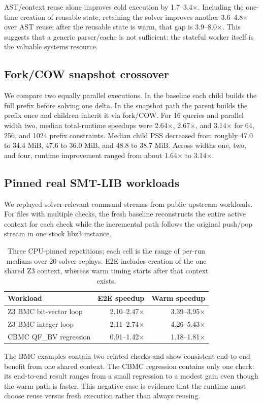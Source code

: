 \documentclass[10pt,twocolumn]{article}
\begin{document}
AST/context reuse alone improves cold execution by 1.7--3.4$\times$.
Including the one-time creation of reusable state, retaining the solver
improves another 3.6--4.8$\times$ over AST reuse; after the reusable state is
warm, that gap is 3.9--8.0$\times$. This suggests that a generic parser/cache
is not sufficient: the stateful worker itself is the valuable systems resource.

\subsection{Fork/COW snapshot crossover}
We compare two equally parallel executions. In the baseline each child builds the full prefix before solving one delta. In the snapshot path the parent builds the prefix once and children inherit it via fork/COW. For 16 queries and parallel width two, median total-runtime speedups were 2.64$\times$, 2.67$\times$, and 3.14$\times$ for 64, 256, and 1024 prefix constraints. Median child PSS decreased from roughly 47.0 to 34.4 MiB, 47.6 to 36.0 MiB, and 48.8 to 38.7 MiB. Across widths one, two, and four, runtime improvement ranged from about 1.64$\times$ to 3.14$\times$.

\subsection{Pinned real SMT-LIB workloads}
We replayed solver-relevant command streams from public upstream workloads. For files with multiple checks, the fresh baseline reconstructs the entire active context for each check while the incremental path follows the original push/pop stream in one stock libz3 instance.
\begin{table}[t]
\centering\small
\begin{tabular}{lrr}
\toprule
Workload & E2E speedup & Warm speedup \\
\midrule
Z3 BMC bit-vector loop & 2.10--2.47$\times$ & 3.39--3.95$\times$ \\
Z3 BMC integer loop & 2.11--2.74$\times$ & 4.26--5.43$\times$ \\
CBMC QF\_BV regression & 0.91--1.42$\times$ & 1.18--1.81$\times$ \\
\bottomrule
\end{tabular}
\caption{Three CPU-pinned repetitions; each cell is the range of per-run
medians over 20 solver replays. E2E includes creation of the one shared Z3
context, whereas warm timing starts after that context exists.}
\end{table}
The BMC examples contain two related checks and show consistent end-to-end
benefit from one shared context. The CBMC regression contains only one check:
its end-to-end result ranges from a small regression to a modest gain even
though the warm path is faster. This negative case is evidence that the
runtime must choose reuse versus fresh execution rather than always reusing.
\end{document}
